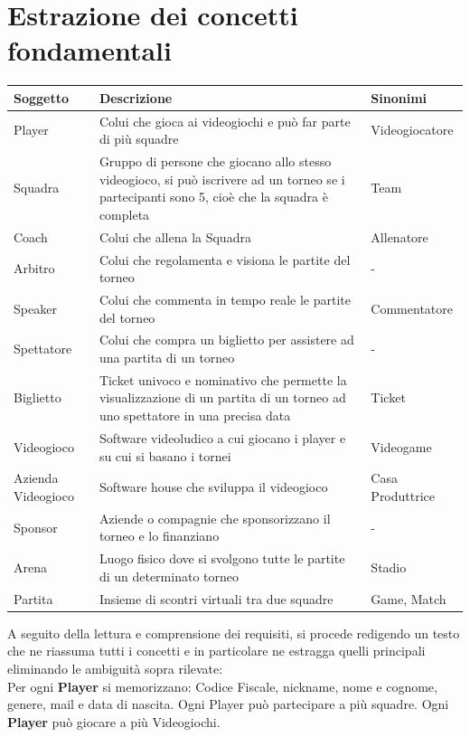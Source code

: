 \documentclass[a4paper,12pt]{report}
\begin{document}
\section{Estrazione dei concetti fondamentali}
\renewcommand{\arraystretch}{1.5}
\setlength{\arrayrulewidth}{0.5mm}
\begin{tabular}{|m{2cm}|m{8cm}|m{3cm}|}
	\hline\rowcolor{pink}
	Soggetto & Descrizione & Sinonimi\\
	\hline\hline
	Player & Colui che gioca ai videogiochi e può far parte di più squadre & Videogiocatore\\
	\hline
	Squadra & Gruppo di persone che giocano allo stesso videogioco, si può iscrivere ad un torneo se i partecipanti sono 5, cioè che la squadra è completa& Team\\
	\hline
	Coach & Colui che allena la Squadra & Allenatore\\
	\hline
	Arbitro & Colui che regolamenta e visiona le partite del torneo & -\\
	\hline
	Speaker & Colui che commenta in tempo reale le partite del torneo & Commentatore\\
	\hline
	Spettatore & Colui che compra un biglietto per assistere ad una partita di un torneo & -\\
	\hline
	Biglietto  & Ticket univoco e nominativo che permette la visualizzazione di un partita di un torneo ad uno spettatore in una precisa data & Ticket\\
	\hline
	Videogioco & Software videoludico a cui giocano i player e su cui si basano i tornei & Videogame\\
	\hline
	Azienda Videogioco & Software house che sviluppa il videogioco & Casa Produttrice\\
	\hline
	Sponsor & Aziende o compagnie che sponsorizzano il torneo e lo finanziano & -\\
	\hline
	Arena & Luogo fisico dove si svolgono tutte le partite di un determinato torneo & Stadio\\
	\hline
	Partita & Insieme di scontri virtuali tra due squadre & Game, Match\\
	\hline
\end{tabular}

%
%
A seguito della lettura e comprensione dei requisiti, si procede redigendo un testo che ne
riassuma tutti i concetti e in particolare ne estragga quelli principali eliminando le ambiguità
sopra rilevate:\\

Per ogni \textbf{Player} si memorizzano: Codice Fiscale, nickname, nome e cognome, genere, mail e data di nascita. Ogni Player può partecipare a più squadre. Ogni \textbf{Player} può giocare a più Videogiochi.
\end{document}
